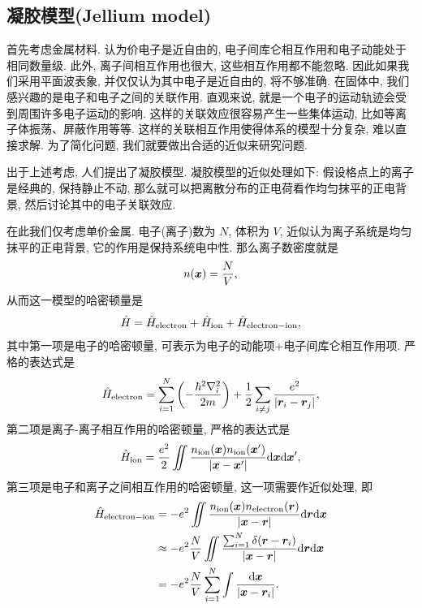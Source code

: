 \subsection{凝胶模型(Jellium model)}
首先考虑金属材料. 认为价电子是近自由的, 电子间库仑相互作用和电子动能处于相同数量级. 此外, 离子间相互作用也很大, 这些相互作用都不能忽略. 因此如果我们采用平面波表象, 并仅仅认为其中电子是近自由的, 将不够准确. 
在固体中, 我们感兴趣的是电子和电子之间的关联作用. 直观来说, 就是一个电子的运动轨迹会受到周围许多电子运动的影响. 这样的关联效应很容易产生一些集体运动, 比如等离子体振荡、屏蔽作用等等. 
这样的关联相互作用使得体系的模型十分复杂, 难以直接求解. 为了简化问题, 我们就要做出合适的近似来研究问题. 

出于上述考虑, 人们提出了凝胶模型. 凝胶模型的近似处理如下: 假设格点上的离子是经典的, 保持静止不动, 那么就可以把离散分布的正电荷看作均匀抹平的正电背景, 然后讨论其中的电子关联效应. 

在此我们仅考虑单价金属. 电子(离子)数为 $N$, 体积为 $V$, 近似认为离子系统是均匀抹平的正电背景, 它的作用是保持系统电中性. 那么离子数密度就是
\begin{equation}
   n(\boldsymbol{x})=\frac{N}{V}, 
\end{equation}
从而这一模型的哈密顿量是
\begin{equation}
   \hat H=\hat H_{\mathrm{electron}}+\hat H_{\mathrm{ion}}+\hat H_{\mathrm{electron-ion}}, 
\end{equation}
其中第一项是电子的哈密顿量, 可表示为电子的动能项+电子间库仑相互作用项. 严格的表达式是
\begin{equation}
   \hat H_{\mathrm{electron}}=\sum_{i=1}^N\left(-\frac{\hbar^2\nabla_i^2}{2m}\right)+\frac{1}{2}\sum_{i\ne j}\frac{e^2}{|\boldsymbol{r}_i-\boldsymbol{r}_j|}, 
\end{equation}
第二项是离子-离子相互作用的哈密顿量, 严格的表达式是
\begin{equation}
   \hat H_{\mathrm{ion}}=\frac{e^2}{2}\iint \frac{n_{\mathrm{ion}}(\boldsymbol{x}) n_{\mathrm{ion}}(\boldsymbol{x}')}{|\boldsymbol{x}-\boldsymbol{x}'|}\mathrm{d}\boldsymbol{x}\mathrm{d}\boldsymbol{x}', 
\end{equation}
第三项是电子和离子之间相互作用的哈密顿量, 这一项需要作近似处理, 即
\begin{align}
      \hat H_{\mathrm{electron-ion}}&=-e^2\iint\frac{n_{\mathrm{ion}}(\boldsymbol{x})n_{\mathrm{electron}}(\boldsymbol{r})}{|\boldsymbol{x}-\boldsymbol{r}|}\mathrm{d}\boldsymbol{r}\mathrm{d}\boldsymbol{x}\nonumber\\
      &\approx -e^2\frac{N}{V}\iint\frac{ \sum_{i=1}^N\delta(\boldsymbol{r}-\boldsymbol{r}_i) }{|\boldsymbol{x}-\boldsymbol{r}|}\mathrm{d}\boldsymbol{r}\mathrm{d}\boldsymbol{x}\nonumber\\
      &=-e^2\frac{N}{V}\sum_{i=1}^N\int\frac{\mathrm{d}\boldsymbol{x}}{|\boldsymbol{x}-\boldsymbol{r}_i|}.
   \end{align}


